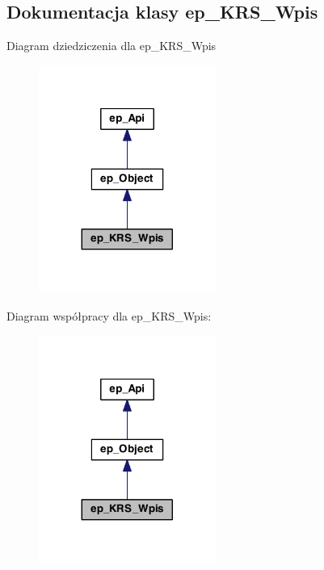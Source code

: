 \hypertarget{classep___k_r_s___wpis}{\subsection{Dokumentacja klasy ep\-\_\-\-K\-R\-S\-\_\-\-Wpis}
\label{classep___k_r_s___wpis}
}


Diagram dziedziczenia dla ep\-\_\-\-K\-R\-S\-\_\-\-Wpis\nopagebreak
\begin{figure}[H]
\begin{center}
\leavevmode
\includegraphics[width=164pt]{classep___k_r_s___wpis__inherit__graph}
\end{center}
\end{figure}


Diagram współpracy dla ep\-\_\-\-K\-R\-S\-\_\-\-Wpis\-:\nopagebreak
\begin{figure}[H]
\begin{center}
\leavevmode
\includegraphics[width=164pt]{classep___k_r_s___wpis__coll__graph}
\end{center}
\end{figure}
